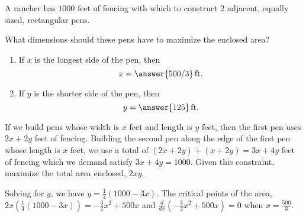 \documentclass{ximera}
\author{Gregory Hartman \and Matthew Carr}
\begin{document}
\begin{exercise}



A rancher has $1000$ feet of fencing with which to construct $2$
adjacent, equally sized, rectangular pens.
\begin{image}
\end{image}
What dimensions should these pens have to maximize the enclosed area?
\begin{prompt}
\begin{enumerate}
\item If $x$ is the longest side of the pen,
  then \[x=\answer{500/3}\,\text{ft.}\]
\item If $y$ is the shorter side of the pen,
  then \[y=\answer{125}\,\text{ft.}\]
\end{enumerate}
\end{prompt}
\begin{hint}
If we build pens whose width is $x$ feet and length is $y$ feet, then
the first pen uses $2x+2y$ feet of fencing. Building the second pen
along the edge of the first pen whose length is $x$ feet, we use a
total of $(2x+2y)+(x+2y)=3x+4y$ feet of fencing which we demand
satisfy $3x+4y=1000$. Given this constraint, maximize the total area
enclosed, $2xy$.
\end{hint}
\begin{hint}
Solving for $y$, we have $y=\frac{1}{4}(1000-3x)$. The critical points
of the area,
$2x\left(\frac{1}{4}(1000-3x)\right)=-\frac{3}{2}x^2+500x$ and
$\frac{d}{dx}(-\frac{3}{2}x^2+500x)=0$ when $x=\frac{500}{3}$. 
\end{hint}

\end{exercise}
\end{document}
